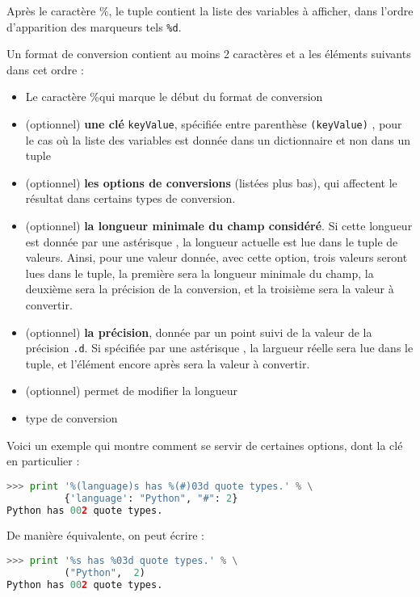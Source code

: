 \documentclass[a4paper,twoside]{article}
\begin{document}
\begin{remarque}
Après le caractère \og\%\fg, le tuple contient la liste des variables à afficher, dans l'ordre d'apparition des marqueurs tels \texttt{\%d}.
\end{remarque}

Un format de conversion contient au moins 2 caractères et a les éléments suivants dans cet ordre :
\begin{itemize}
\item Le caractère \og\%\fg qui marque le début du format de conversion
\item (optionnel) \textbf{une clé} \texttt{keyValue}, spécifiée entre parenthèse \texttt{(keyValue)} , pour le cas où la liste des variables est donnée dans un dictionnaire et non dans un tuple
\item (optionnel) \textbf{les options de conversions} (listées plus bas), qui affectent le résultat dans certains types de conversion.
\item (optionnel) \textbf{la longueur minimale du champ considéré}. Si cette longueur est donnée par une astérisque \og *\fg, la longueur actuelle est lue dans le tuple de valeurs. Ainsi, pour une valeur donnée, avec cette option, trois valeurs seront lues dans le tuple, la première sera la longueur minimale du champ, la deuxième sera la précision de la conversion, et la troisième sera la valeur à convertir.
\item (optionnel) \textbf{la précision}, donnée par un point suivi de la valeur de la précision \texttt{.d}. Si spécifiée par une astérisque \og * \fg, la largueur réelle sera lue dans le tuple, et l'élément encore après sera la valeur à convertir.
\item (optionnel) permet de modifier la longueur
\item type de conversion
\end{itemize}

Voici un exemple qui montre comment se servir de certaines options, dont la clé en particulier : 
\begin{lstlisting}[language=python]
>>> print '%(language)s has %(#)03d quote types.' % \
          {'language': "Python", "#": 2}
Python has 002 quote types.
\end{lstlisting}

De manière équivalente, on peut écrire :
\begin{lstlisting}[language=python]
>>> print '%s has %03d quote types.' % \
          ("Python",  2)
Python has 002 quote types.
\end{lstlisting}
\end{document}

